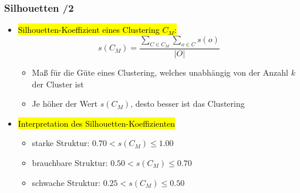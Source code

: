 

\begin{frame}
\frametitle{Silhouetten /2}

\begin{itemize}
\item \hl{Silhouetten-Koeffizient eines Clustering $C_M$:}
$$s(C_M) = \frac{\displaystyle\sum_{C\in C_M} \displaystyle\sum_{o \in C} s(o)}{|O|}$$
\begin{itemize}
\item Maß für die Güte eines Clustering, welches unabhängig von der
  Anzahl $k$ der Cluster ist
\item Je höher der Wert $s(C_M)$, desto besser ist das Clustering
\end{itemize}
\item\hl{Interpretation des Silhouetten-Koeffizienten}
\begin{itemize}
\item starke Struktur: $0.70 < s(C_M) \leq 1.00$
\item brauchbare Struktur: $0.50 < s(C_M) \leq 0.70$
\item schwache Struktur: $0.25 < s(C_M) \leq 0.50$
\end{itemize}
\end{itemize}
\end{frame}


